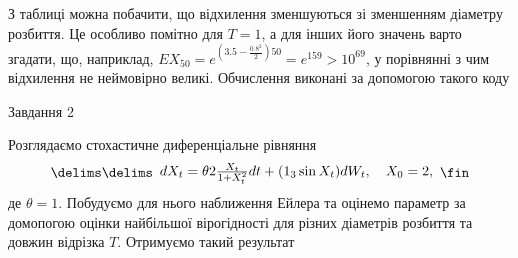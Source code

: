 \documentclass[12pt]{article}
\makeatletter
\def\@bra#1#2\delims#3\fin{\kern-\nulldelimiterspace\left#1#3\right#2\kern-\nulldelimiterspace}
\newcommand\bra[2][()]{\@bra#1\delims#2\fin}
\newcommand\eq[3][..]{\begin{equation*}\bra[#1]{\begin{array}{#2}#3\end{array}}\end{equation*}}
\makeatother
\begin{document}
З таблиці можна побачити, що відхилення зменшуються зі зменшенням діаметру розбиття. Це особливо помітно для $T=1$, а для інших його значень варто згадати, що, наприклад, $E X_{50} = e^{(3.5 - \frac{0.8^2}{2})50} = e^{159} > 10^{69}$, у порівнянні з чим відхилення не неймовірно великі.
Обчислення виконані за допомогою такого коду




\centerline{Завдання 2}
Розглядаємо стохастичне диференціальне рівняння
\eq{c}{dX_t = \theta2\frac{X_t}{1 + X_t^2}dt + (1 _ 3\sin X_t)dW_t, \quad X_0 = 2,}
де $\theta=1$. Побудуємо для нього наближення Ейлера та оцінемо параметр за домопогою оцінки найбільшої вірогідності для різних діаметрів розбиття та довжин відрізка $T$. Отримуємо такий результат
\end{document}
